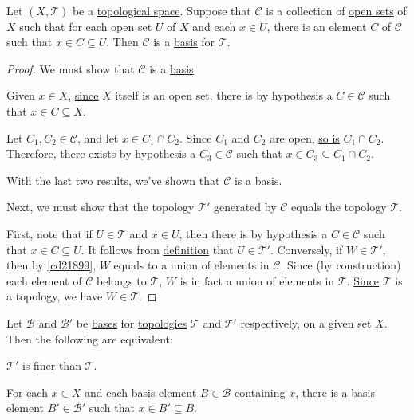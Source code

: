 Let $(X,\mathcal T)$ be a \href{de3c1b1}{topological space}. Suppose that
$\mathcal C$ is a collection of \href{c4490f8}{open sets} of $X$ such that for
each open set $U$ of $X$ and each $x\in U$, there is an element $C$ of
$\mathcal C$ such that $x\in C\subseteq U$. Then $\mathcal C$ is a
\href{e896402}{basis} for $\mathcal T$.

\begin{proof}
  We must show that $\mathcal C$ is a \href{e896402}{basis}.

  Given $x\in X$, \href{cc8eb8b}{since} $X$ itself is an open set, there is by
  hypothesis a $C\in\mathcal C$ such that $x\in C\subseteq X$.

  Let $C_1,C_2\in\mathcal C$, and let $x\in C_1\cap C_2$. Since $C_1$ and $C_2$
  are open, \href{cc8eb8b}{so is} $C_1\cap C_2$. Therefore, there exists by
  hypothesis a $C_3\in\mathcal C$ such that $x\in C_3\subseteq C_1\cap C_2$.

  With the last two results, we've shown that $\mathcal C$ is a basis.

  Next, we must show that the topology $\mathcal T'$ generated by $\mathcal C$
  equals the topology $\mathcal T$.

  First, note that if $U\in\mathcal T$ and $x\in U$, then there is by
  hypothesis a $C\in\mathcal C$ such that $x\in C\subseteq U$. It follows from
  \href{e896402}{definition} that $U\in\mathcal T'$. Conversely, if
  $W\in\mathcal T'$, then by \autoref{cd21899}, $W$ equals to a union of
  elements in $\mathcal C$. Since (by construction) each element of $\mathcal
  C$ belongs to $\mathcal T$, $W$ is in fact a union of elements in $\mathcal
  T$. \href{cc8eb8b}{Since} $\mathcal T$ is a topology, we have $W\in\mathcal
  T$.
\end{proof}

\label{fb92a68}

Let $\mathcal B$ and $\mathcal B'$ be \href{e896402}{bases} for
\href{cc8eb8b}{topologies} $\mathcal T$ and $\mathcal T'$ respectively, on a
given set $X$. Then the following are equivalent:
\begin{enumerati}
  \item $\mathcal T'$ is \href{e04d168}{finer} than $\mathcal T$.
  \item For each $x\in X$ and each basis element $B\in\mathcal B$ containing
        $x$, there is a basis element $B'\in\mathcal B'$ such that $x\in
        B'\subseteq B$.
\end{enumerati}

